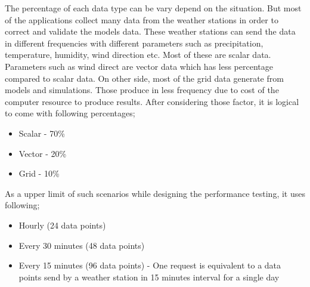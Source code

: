 The percentage of each data type can be vary depend on the situation. But most of the applications collect many data from the weather stations in order to correct and validate the models data. These weather stations can send the data in different frequencies with different parameters such as precipitation, temperature, humidity, wind direction etc.
Most of these are scalar data. Parameters such as wind direct are vector data which has less percentage compared to scalar data. On other side, most of the grid data generate from models and simulations. Those produce in less frequency due to cost of the computer resource to produce results. After considering those factor, it is logical to come with following percentages;
\begin{itemize}
    \item Scalar - 70\%
    \item Vector - 20\%
    \item Grid - 10\%
\end{itemize}

As a upper limit of such scenarios while designing the performance testing, it uses following;
\begin{itemize}
    \item Hourly (24 data points) 
    \item Every 30 minutes (48 data points)
    \item Every 15 minutes (96 data points) - One request is equivalent to a data points send by a weather station in 15 minutes interval for a single day
\end{itemize}

